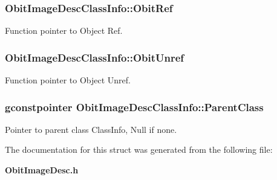 \subsubsection{ {\bf Obit\-Image\-Desc\-Class\-Info::Obit\-Ref}}\label{structObitImageDescClassInfo_o10}


Function pointer to Object Ref. 

\subsubsection{ {\bf Obit\-Image\-Desc\-Class\-Info::Obit\-Unref}}\label{structObitImageDescClassInfo_o11}


Function pointer to Object Unref. 

\subsubsection{\setlength{\rightskip}{0pt plus 5cm}gconstpointer {\bf Obit\-Image\-Desc\-Class\-Info::Parent\-Class}}\label{structObitImageDescClassInfo_o3}


Pointer to parent class Class\-Info, Null if none. 



The documentation for this struct was generated from the following file:\begin{CompactItemize}
\item 
{\bf Obit\-Image\-Desc.h}\end{CompactItemize}

